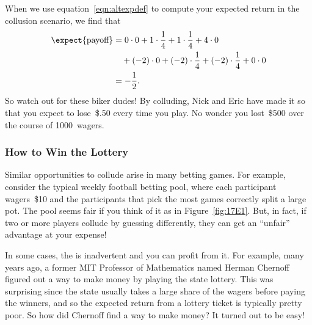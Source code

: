When we use equation~\eqref{eqn:altexpdef} to compute your expected
return in the collusion scenario, we find that
\begin{align*}
\expect{\text{payoff}}
    &= 0 \cdot 0 + 1 \cdot \frac{1}{4} + 1 \cdot \frac{1}{4}
        + 4 \cdot 0 \\
        & \quad {}+ (-2) \cdot 0 + (-2) \cdot \frac{1}{4}
        + (-2) \cdot \frac{1}{4}
        + 0 \cdot 0 \\
    &= -\frac{1}{2}.
\end{align*}
So watch out for these biker dudes!  By colluding, Nick and Eric have
made it so that you expect to lose~\$.50 every time you play.  No
wonder you lost~\$500 over the course of 1000~wagers.

\subsubsection{How to Win the Lottery}

Similar opportunities to collude arise in many betting games.
For example, consider the typical weekly football betting pool, where
each participant wagers~\$10 and the participants that pick the most
games correctly split a large pot.  The pool seems fair if you think
of it as in Figure~\ref{fig:17E1}.  But, in fact, if two or more
players collude by guessing differently, they can get an
``unfair'' advantage at your expense!

In some cases, the  is inadvertent and you can profit
from it.  For example, many years ago, a former MIT Professor of
Mathematics named Herman Chernoff figured out a way to make money by
playing the state lottery.  This was surprising since the state
usually takes a large share of the wagers before paying
the winners, and so the expected return from a lottery ticket is
typically pretty poor.  So how did Chernoff find a way to make money?
It turned out to be easy!

